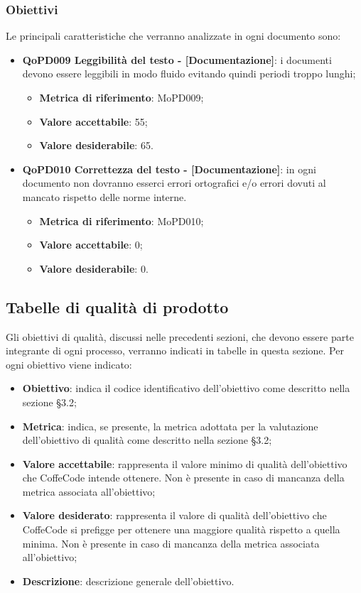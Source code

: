 \documentclass[../piano-di-qualifica.tex]{subfiles}
\begin{document}
\subsubsection{Obiettivi}
\label{sub:obiettivi}
Le principali caratteristiche che verranno analizzate in ogni documento sono:
\begin{itemize}
    \item \textbf{QoPD009 Leggibilità del testo - [Documentazione]}: i documenti devono essere leggibili in modo fluido evitando quindi periodi troppo lunghi;
        \begin{itemize}
            \item \textbf{Metrica di riferimento}: MoPD009;
            \item \textbf{Valore accettabile}: 55;
            \item \textbf{Valore desiderabile}: 65.
        \end{itemize}
    \item \textbf{QoPD010 Correttezza del testo - [Documentazione]}: in ogni documento non dovranno esserci errori ortografici e/o errori dovuti al mancato rispetto delle norme interne.
        \begin{itemize}
            \item \textbf{Metrica di riferimento}: MoPD010;
            \item \textbf{Valore accettabile}: 0;
            \item \textbf{Valore desiderabile}: 0.
        \end{itemize}
\end{itemize}

\subsection{Tabelle di qualità di prodotto}
\label{sub:tabelle_di_qualita_di_prodotto}
Gli obiettivi di qualità, discussi nelle precedenti sezioni, che devono essere parte integrante di ogni processo, verranno indicati in tabelle in questa sezione.
Per ogni obiettivo viene indicato:

\begin{itemize}
   \item \textbf{Obiettivo}: indica il codice identificativo dell'obiettivo come descritto nella sezione §3.2;
   \item \textbf{Metrica}: indica, se presente, la metrica adottata per la valutazione dell'obiettivo di qualità come descritto nella sezione §3.2;
   \item \textbf{Valore accettabile}: rappresenta il valore minimo di qualità dell'obiettivo che CoffeCode intende ottenere. Non è presente in caso di mancanza della metrica associata all'obiettivo;
   \item \textbf{Valore desiderato}: rappresenta il valore di qualità dell'obiettivo che CoffeCode si prefigge per ottenere una maggiore qualità rispetto a quella minima. Non è presente in caso di mancanza della metrica associata all'obiettivo;
   \item \textbf{Descrizione}: descrizione generale dell'obiettivo.
\end{itemize}
\end{document}

